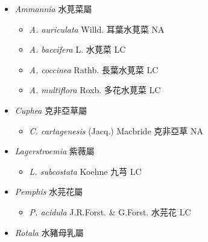 
  \begin{itemize}
 \item[] \textit{Ammannia} 水莧菜屬
                                
  \begin{itemize}
        \item[] \textit{A. auriculata} Willd.  耳葉水莧菜   NA
        \item[] \textit{A. baccifera} L.  水莧菜   LC
        \item[] \textit{A. coccinea} Rathb.  長葉水莧菜   LC
        \item[] \textit{A. multiflora} Roxb.  多花水莧菜   LC
  \end{itemize}
 \item[] \textit{Cuphea} 克非亞草屬
                                
  \begin{itemize}
        \item[] \textit{C. cartagenesis} (Jacq.) Macbride  克非亞草   NA
  \end{itemize}
 \item[] \textit{Lagerstroemia} 紫薇屬
                                
  \begin{itemize}
        \item[] \textit{L. subcostata} Koehne  九芎   LC
  \end{itemize}
 \item[] \textit{Pemphis} 水芫花屬
                                
  \begin{itemize}
        \item[] \textit{P. acidula} J.R.Forst. \& G.Forst.  水芫花   LC
  \end{itemize}
 \item[] \textit{Rotala} 水豬母乳屬
                                

\end{itemize}
